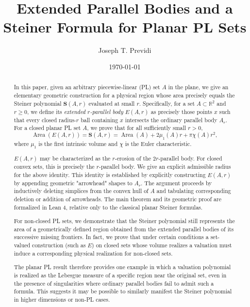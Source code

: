 \documentclass[11pt]{article}
\title{Extended Parallel Bodies and a Steiner Formula for Planar PL Sets}
\author{Joseph T. Previdi}
\date{\today}
\newcommand{\R}{\mathbb R}
\newcommand{\Area}{\operatorname{Area}}
\numberwithin{equation}{section}
\begin{document}
\maketitle

\begin{abstract}In this paper, given an arbitrary piecewise-linear (PL) set $A$ in the plane, we give an elementary geometric construction for a physical region whose area precisely equals the Steiner polynomial $\mathbf{S}(A,r)$ evaluated at small $r$. Specifically, for a set $A\subset\R^2$ and $r\ge 0$, we define its \textit{extended $r$-parallel body} $E(A,r)$ as precisely those points $x$ such that every closed radius-$r$ ball containing $x$ intersects the ordinary parallel body $A_r$. For a closed planar PL set $A$, we prove that for all sufficiently small $r>0$,
	\[
	\Area(E(A,r))=\mathbf{S}(A,r)=\Area(A)+2\mu_1(A)r+\pi\chi(A)r^2,
	\]
	where $\mu_1$ is the first intrinsic volume and $\chi$ is the Euler characteristic. 
	
	$E(A,r)$ may be characterized as the $r$-erosion of the $2r$-parallel body. For closed convex sets, this is precisely the $r$-parallel body. We give an explicit admissible radius for the above identity. This identity is established by explicitly constructing $E(A,r)$ by appending geometric "arrowhead" shapes to $A_r$. The argument proceeds by inductively deleting simplices from the convex hull of $A$ and tabulating corresponding deletion or addition of arrowheads. The main theorem and its geometric proof are formalized in Lean 4, relative only to the classical planar Steiner formulas.
	
	For non-closed PL sets, we demonstrate that the Steiner polynomial still represents the area of a geometrically defined region obtained from the extended parallel bodies of its successive missing frontiers. In fact, we prove that under certain conditions a set-valued construction (such as $E$) on closed sets whose volume realizes a valuation must induce a corresponding physical realization for non-closed sets. 
	
	The planar PL result therefore provides one example in which a valuation polynomial is realized as the Lebesgue measure of a specific region near the original set, even in the presence of singularities where ordinary parallel bodies fail to admit such a formula. This suggests it may be possible to similarly manifest the Steiner polynomial in higher dimensions or non-PL cases.
\end{abstract}

\tableofcontents
\end{document}

